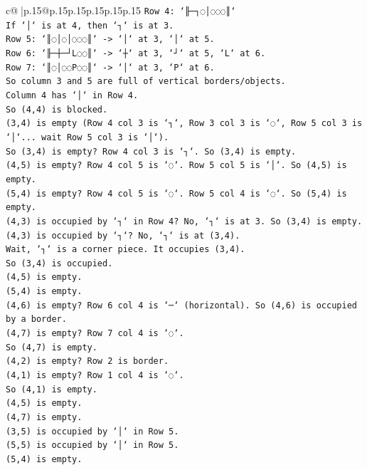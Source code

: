 \documentclass{article}
\begin{document}
{\begin{supertabular}{c@{$\;$}|p{.15\linewidth}@{}p{.15\linewidth}p{.15\linewidth}p{.15\linewidth}p{.15\linewidth}p{.15\linewidth}}
{{{\texttt{Row 4: `╟─┐◌│◌◌◌║`} \\
\texttt{If `│` is at 4, then `┐` is at 3.} \\
\texttt{Row 5: `║◌│◌│◌◌◌║` {-}> `│` at 3, `│` at 5.} \\
\texttt{Row 6: `╟─┼─┘L◌◌║` {-}> `┼` at 3, `┘` at 5, `L` at 6.} \\
\texttt{Row 7: `║◌│◌◌P◌◌║` {-}> `│` at 3, `P` at 6.} \\
\texttt{So column 3 and 5 are full of vertical borders/objects.} \\
\texttt{Column 4 has `│` in Row 4.} \\
\texttt{So (4,4) is blocked.} \\
\texttt{(3,4) is empty (Row 4 col 3 is `┐`, Row 3 col 3 is `◌`, Row 5 col 3 is `│`... wait Row 5 col 3 is `│`).} \\
\texttt{So (3,4) is empty? Row 4 col 3 is `┐`. So (3,4) is empty.} \\
\texttt{(4,5) is empty? Row 4 col 5 is `◌`. Row 5 col 5 is `│`. So (4,5) is empty.} \\
\texttt{(5,4) is empty? Row 4 col 5 is `◌`. Row 5 col 4 is `◌`. So (5,4) is empty.} \\
\texttt{(4,3) is occupied by `┐` in Row 4? No, `┐` is at 3. So (3,4) is empty. (4,3) is occupied by `┐`? No, `┐` is at (3,4).} \\
\texttt{Wait, `┐` is a corner piece. It occupies (3,4).} \\
\texttt{So (3,4) is occupied.} \\
\texttt{(4,5) is empty.} \\
\texttt{(5,4) is empty.} \\
\texttt{(4,6) is empty? Row 6 col 4 is `─` (horizontal). So (4,6) is occupied by a border.} \\
\texttt{(4,7) is empty? Row 7 col 4 is `◌`.} \\
\texttt{So (4,7) is empty.} \\
\texttt{(4,2) is empty? Row 2 is border.} \\
\texttt{(4,1) is empty? Row 1 col 4 is `◌`.} \\
\texttt{So (4,1) is empty.} \\
\texttt{(4,5) is empty.} \\
\texttt{(4,7) is empty.} \\
\texttt{(3,5) is occupied by `│` in Row 5.} \\
\texttt{(5,5) is occupied by `│` in Row 5.} \\
\texttt{(5,4) is empty.} \\
}}}
\end{supertabular}}
\end{document}
